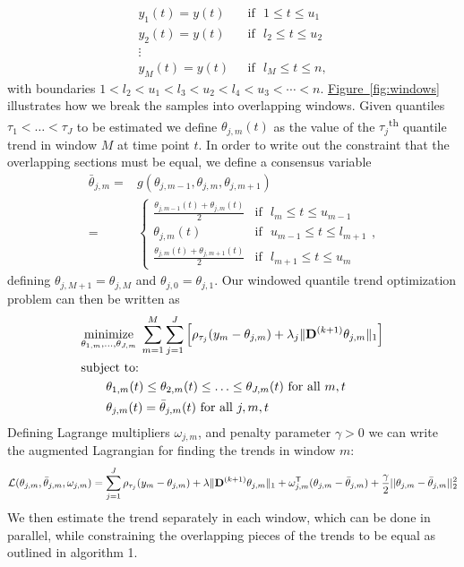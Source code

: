 \documentclass[12pt]{article}
\newcommand{\Fig}[1]{\hyperref[fig:#1]{Figure~\ref*{fig:#1}}} %
\newcommand{\Fig}[1]{{Figure~\ref{fig:#1}}} %
\newcommand{\Tra}{^{\sf T}} %
\newcommand{\M}[1]{{\bm{\mathbf{\MakeUppercase{#1}}}}} %
\newcommand{\Mn}[2]{\M{#1}^{(#2)}} %
\begin{document}
	\begin{align*}
	y_1(t) = y(t) & \mbox{~~if~~} 1 \le t \le u_{1}\\
	y_2(t) = y(t) & \mbox{~~if~~} l_{2} \le t \le u_{2} \\
	\vdots & \\
	y_M(t) = y(t) & \mbox{~~if~~} l_{M} \le t \le  n,
	\end{align*}
with boundaries $1 < l_{2} < u_{1} < l_{3} < u_{2} < l_{4} < u_{3} < \cdots< n$. \Fig{windows} illustrates how we break the samples into overlapping windows. Given quantiles $\tau_1 < \ldots < \tau_J$ to be estimated we define $\theta_{j,m}(t)$ as the value of the $\tau_j$\textsuperscript{th} quantile trend in window $M$ at time point $t$. In order to write out the constraint that the overlapping sections must be equal, we define a consensus variable
	 \begin{align*}
		 \bar{\theta}_{j,m} =&  g(\theta_{j, m-1}, \theta_{j,m}, \theta_{j,m+1}) \\
		 =& \begin{cases} 
			 \frac{\theta_{j,m-1}(t)+\theta_{j,m}(t)}{2} & \mbox{if~~} l_{m} \le t \le u_{m-1}  \\
			 \theta_{j,m}(t) & \mbox{if~~} u_{m-1} \le t \le l_{m+1}  \\
			 \frac{\theta_{j,m}(t)+\theta_{j,m+1}(t)}{2} & \mbox{if~~} l_{m+1} \le t \le u_{m}  
			 \end{cases},
	\end{align*}
	defining $\theta_{j,M+1} = \theta_{j,M}$ and $\theta_{j,0} = \theta_{j,1}$. Our windowed quantile trend optimization problem can then be written as 
	 \begin{align*}
		 \label{eq:quantile_windows}
		 &\underset{\theta_{1,m}, \ldots, \theta_{J,m}}{\text{minimize}}\; \sum_{m=1}^M\sum_{j=1}^J \left [\rho_{\tau_j}(y_m - \theta_{j,m}) + 
		 \lambda_j \lVert \Mn{D}{k+1} \theta_{j,m} \rVert_1 \right ] \\
		 &\text{subject to: }\; \\
		 &\qquad \theta_{1,m}(t) \le \theta_{2,m}(t) \le \ldots \le \theta_{J,m}(t) \text{ for all } m,t \\
		 &\qquad \theta_{j,m}(t) = \bar{\theta}_{j,m}(t) \text{ for all } j, m, t
	 \end{align*}
	 Defining Lagrange multipliers $\omega_{j,m}$, and penalty parameter $\gamma > 0$ we can write the augmented Lagrangian for finding the trends in window $m$:
	 \begin{equation*}
	 \mathcal{L}(\theta_{j,m}, \bar{\theta}_{j,m}, \omega_{j,m}) = \sum_{j=1}^J\rho_{\tau_j}(y_m - \theta_{j,m})+\lambda \lVert \Mn{D}{k+1}\theta_{j,m}\rVert_1 +  \omega_{j,m}\Tra(\theta_{j,m} - \bar{\theta}_{j,m}) + 
	 \frac{\gamma}{2}||\theta_{j,m} - \bar{\theta}_{j,m}||_2^2
	 \end{equation*}
	 We then estimate the trend separately in each window, which can be done in parallel, while constraining the overlapping pieces of the trends to be equal as outlined in algorithm 1. 
	 
\end{document}
